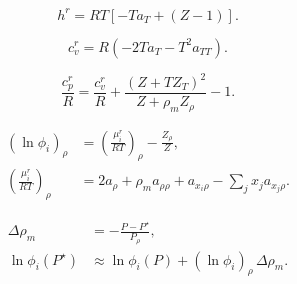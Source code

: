 \documentclass[11pt]{article}
\begin{document}
\begin{equation}
h^r=RT\left[-Ta_T+(Z-1)\right].
\label{eq:residual_enthalpy}
\end{equation}

\begin{equation}
c_v^r=R\left(-2Ta_T-T^2a_{TT}\right).
\label{eq:residual_heat_capacity_cv}
\end{equation}

\begin{equation}
\frac{c_p^r}{R}
=\frac{c_v^r}{R}
+\frac{(Z+TZ_T)^2}{Z+\rho_mZ_\rho}-1.
\label{eq:residual_heat_capacity_cp}
\end{equation}

\begin{equation}
\begin{aligned}
\left(\ln\phi_i\right)_\rho
&=\left(\frac{\mu_i^r}{RT}\right)_\rho-\frac{Z_\rho}{Z},\\
\left(\frac{\mu_i^r}{RT}\right)_\rho
&=2a_\rho+\rho_ma_{\rho\rho}
+a_{x_i\rho}-\sum_jx_ja_{x_j\rho}.
\end{aligned}
\label{eq:log_fugacity_density_derivative}
\end{equation}

\begin{equation}
\begin{aligned}
\Delta\rho_m&=-\frac{P-P^\star}{P_\rho},\\
\ln\phi_i(P^\star)&\approx
\ln\phi_i(P)+(\ln\phi_i)_\rho\,\Delta\rho_m.
\end{aligned}
\label{eq:fixed_pressure_fugacity_correction}
\end{equation}
\end{document}

